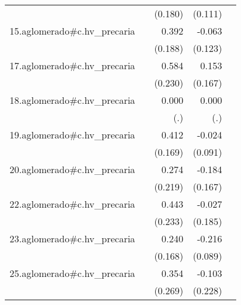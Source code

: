 {\begin{longtable}{l*{4}{D{.}{.}{-1}}}
            &                     &     (0.180)         &     (0.111)         &                     \\
\addlinespace
15.aglomerado#c.hv\_precaria&                     &       0.392\sym{*}  &      -0.063         &                     \\
            &                     &     (0.188)         &     (0.123)         &                     \\
\addlinespace
17.aglomerado#c.hv\_precaria&                     &       0.584\sym{*}  &       0.153         &                     \\
            &                     &     (0.230)         &     (0.167)         &                     \\
\addlinespace
18.aglomerado#c.hv\_precaria&                     &       0.000         &       0.000         &                     \\
            &                     &         (.)         &         (.)         &                     \\
\addlinespace
19.aglomerado#c.hv\_precaria&                     &       0.412\sym{*}  &      -0.024         &                     \\
            &                     &     (0.169)         &     (0.091)         &                     \\
\addlinespace
20.aglomerado#c.hv\_precaria&                     &       0.274         &      -0.184         &                     \\
            &                     &     (0.219)         &     (0.167)         &                     \\
\addlinespace
22.aglomerado#c.hv\_precaria&                     &       0.443         &      -0.027         &                     \\
            &                     &     (0.233)         &     (0.185)         &                     \\
\addlinespace
23.aglomerado#c.hv\_precaria&                     &       0.240         &      -0.216\sym{*}  &                     \\
            &                     &     (0.168)         &     (0.089)         &                     \\
\addlinespace
25.aglomerado#c.hv\_precaria&                     &       0.354         &      -0.103         &                     \\
            &                     &     (0.269)         &     (0.228)         &                     \\

\end{longtable}}
